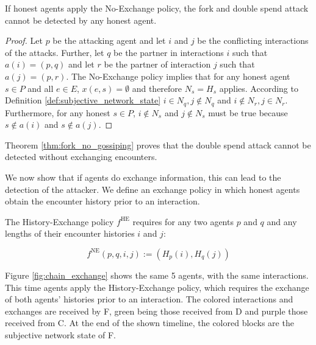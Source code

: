\begin{thm}
    \label{thm:fork_no_gossiping}
    If honest agents apply the No-Exchange policy, the fork and double spend attack cannot be detected by any honest agent.
\end{thm}
\begin{proof}
    Let $p$ be the attacking agent and let $i$ and $j$ be the conflicting interactions of the 
    attacks. Further, let $q$ be the partner in interactions $i$ such that $a(i) = (p, q)$ and let 
    $r$ be the partner of interaction $j$ such that $a(j) = (p, r)$. 
    The No-Exchange policy implies that for any honest agent $s \in P$ and all $e \in E$, $x(e, s) = \emptyset$ 
    and therefore $N_s = H_s$ applies. 
    According to Definition \ref{def:subjective_network_state} $i \in N_{q}, j \notin N_{q}$ and 
    $i \notin N_{r}, j \in N_{r}$. 
    Furthermore, for any honest $s \in P$, $i \notin N_s$ and $j \notin N_s$ must be true because
    $s \notin a(i)$ and $s \notin a(j)$.
\end{proof}

Theorem \ref{thm:fork_no_gossiping} proves that the double spend attack cannot be
detected without exchanging encounters. 

We now show that if agents do exchange information, this can lead to the detection of the attacker. We
define an exchange policy in which honest agents obtain the encounter history prior to an interaction.

\begin{pol}
    \label{pol:one}
    The History-Exchange policy $f^{\text{HE}}$ requires for 
    any two agents $p$ and $q$ and any lengths of their encounter histories $i$ and $j$: 

    \begin{equation}
        f^{\text{NE}}(p,q,i,j) := (H_p(i), H_q(j))
    \end{equation}
\end{pol}

Figure \ref{fig:chain_exchange} shows the same 5 agents, with the same interactions. This time agents
apply the History-Exchange policy, which requires the exchange of both agents' histories prior to 
an interaction. The colored interactions and exchanges are received by F, green being those received
from D and purple those received from C. At the end of the shown timeline, the colored blocks are 
the subjective network state of F.

